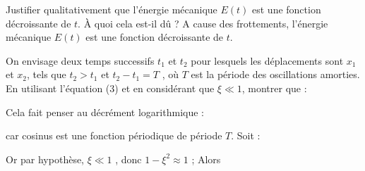 \documentclass[a4paper, 10pt, garamond]{book}
\begin{document}
\QR
{Justifier qualitativement que l’énergie mécanique $E(t)$ est une fonction décroissante de $t$. À quoi cela est-il dû ?}
{
A cause des frottements, l’énergie mécanique $E(t)$ est une fonction décroissante de $t$.
}

\QR
{On envisage deux temps successifs $t_1$ et $t_2$ pour lesquels les déplacements sont $x_1$ et $x_2$, tels que $t_2 > t_1$ 
et $t_2-t_1=T$ , où $T$ est la période des oscillations amorties. 
En utilisant l’équation (3) et en considérant que $\xi \ll 1$, montrer que :            

}
{
Cela fait penser au décrément logarithmique :

 
 \noindent
  car cosinus est une fonction périodique de période $T$.
Soit : 



Or par hypothèse,  $\xi \ll 1$ , donc $1-\xi^2\approx 1$ ; Alors

}
\end{document}
